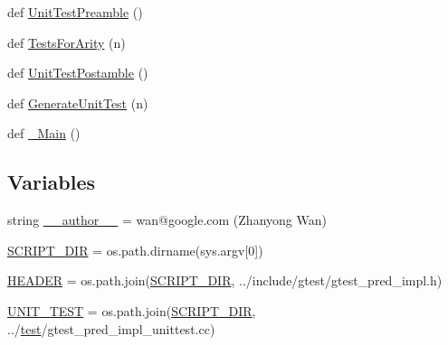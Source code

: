 \begin{DoxyCompactItemize}
\item 
def \mbox{\hyperlink{namespacegoogletest-master_1_1googletest_1_1scripts_1_1gen__gtest__pred__impl_a1ca8f84f9c1c030727133efe09b704aa}{Unit\+Test\+Preamble}} ()
\item 
def \mbox{\hyperlink{namespacegoogletest-master_1_1googletest_1_1scripts_1_1gen__gtest__pred__impl_ada86e9afeb21f0e2fb524e12f6c1b2db}{Tests\+For\+Arity}} (n)
\item 
def \mbox{\hyperlink{namespacegoogletest-master_1_1googletest_1_1scripts_1_1gen__gtest__pred__impl_af9d59c15effe7759757777b08169d1bc}{Unit\+Test\+Postamble}} ()
\item 
def \mbox{\hyperlink{namespacegoogletest-master_1_1googletest_1_1scripts_1_1gen__gtest__pred__impl_a6bff3ef3957dc3ce469662f51f08f2d2}{Generate\+Unit\+Test}} (n)
\item 
def \mbox{\hyperlink{namespacegoogletest-master_1_1googletest_1_1scripts_1_1gen__gtest__pred__impl_aaee30d47547b729195d09fc4eafa7487}{\+\_\+\+Main}} ()
\end{DoxyCompactItemize}
\subsection*{Variables}
\begin{DoxyCompactItemize}
\item 
string \mbox{\hyperlink{namespacegoogletest-master_1_1googletest_1_1scripts_1_1gen__gtest__pred__impl_a961b1d3d2a4543ca0f758bb65b4a5572}{\+\_\+\+\_\+author\+\_\+\+\_\+}} = \textquotesingle{}wan@google.\+com (Zhanyong Wan)\textquotesingle{}
\item 
\mbox{\hyperlink{namespacegoogletest-master_1_1googletest_1_1scripts_1_1gen__gtest__pred__impl_a60ad41916eeebd40393b4def4f378b53}{S\+C\+R\+I\+P\+T\+\_\+\+D\+IR}} = os.\+path.\+dirname(sys.\+argv\mbox{[}0\mbox{]})
\item 
\mbox{\hyperlink{namespacegoogletest-master_1_1googletest_1_1scripts_1_1gen__gtest__pred__impl_aa571150af4d7157f72f367881fca920b}{H\+E\+A\+D\+ER}} = os.\+path.\+join(\mbox{\hyperlink{namespacegoogletest-master_1_1googletest_1_1scripts_1_1gen__gtest__pred__impl_a60ad41916eeebd40393b4def4f378b53}{S\+C\+R\+I\+P\+T\+\_\+\+D\+IR}}, \textquotesingle{}../include/gtest/gtest\+\_\+pred\+\_\+impl.\+h\textquotesingle{})
\item 
\mbox{\hyperlink{namespacegoogletest-master_1_1googletest_1_1scripts_1_1gen__gtest__pred__impl_aa0cb0907a6ca38f18bb193457840140b}{U\+N\+I\+T\+\_\+\+T\+E\+ST}} = os.\+path.\+join(\mbox{\hyperlink{namespacegoogletest-master_1_1googletest_1_1scripts_1_1gen__gtest__pred__impl_a60ad41916eeebd40393b4def4f378b53}{S\+C\+R\+I\+P\+T\+\_\+\+D\+IR}}, \textquotesingle{}../\mbox{\hyperlink{_mutual_8h_a707ee03719e99670bf6cfdfd897b8456}{test}}/gtest\+\_\+pred\+\_\+impl\+\_\+unittest.\+cc\textquotesingle{})
\end{DoxyCompactItemize}


